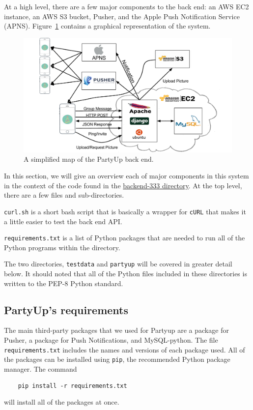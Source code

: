 \documentclass[12pt]{article}
\begin{document}
At a high level, there are a few major components to the back end:
an AWS EC2 instance, an AWS S3 bucket, Pusher, and the Apple Push Notification Service (APNS).
Figure~\ref{fig:stack} contains a graphical representation of the system.

\begin{figure}[h]
    \centering
    \includegraphics[scale=0.4]{Stack.png}
    \caption{
        A simplified map of the PartyUp back end. 
    }
    \label{fig:stack}
\end{figure}


In this section, we will give an overview each of major components in this system
in the context of the code found in the
\href{https://github.com/BDGL-Hacks/backend-333}{backend-333 directory}.
At the top level, there are a few files and sub-directories.

\texttt{curl.sh} is a short bash script that is basically a wrapper for 
\texttt{cURL} that makes it a little easier to test the back end API.

\texttt{requirements.txt} is a list of Python packages that are needed to
run all of the Python programs within the directory.

The two directories, \texttt{testdata} and \texttt{partyup} will be covered
in greater detail below.
It should noted that all of the Python files included in these directories
is written to the PEP-8 Python standard.

\subsection{PartyUp's requirements}

The main third-party packages that we used for Partyup are a package for Pusher, a package for Push Notifications, and MySQL-python. 
The file \texttt{requirements.txt} includes the names and versions of each package used.
All of the packages can be installed using \texttt{pip}, the recommended
Python package manager.
The command
\begin{lstlisting}
    pip install -r requirements.txt
\end{lstlisting}
will install all of the packages at once.
\end{document}
